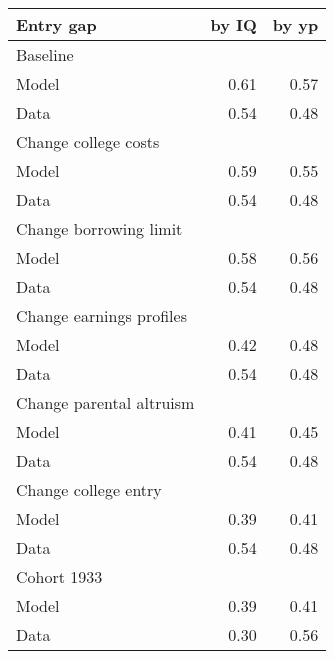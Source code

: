 \begin{tabular}{lrr}
\hline
Entry gap & by IQ  & by yp  \\ 
\hline
Baseline &   &   \\ 
Model & 0.61  & 0.57  \\ 
Data & 0.54  & 0.48  \\ 
Change college costs &   &   \\ 
Model & 0.59  & 0.55  \\ 
Data & 0.54  & 0.48  \\ 
Change borrowing limit &   &   \\ 
Model & 0.58  & 0.56  \\ 
Data & 0.54  & 0.48  \\ 
Change earnings profiles &   &   \\ 
Model & 0.42  & 0.48  \\ 
Data & 0.54  & 0.48  \\ 
Change parental altruism &   &   \\ 
Model & 0.41  & 0.45  \\ 
Data & 0.54  & 0.48  \\ 
Change college entry &   &   \\ 
Model & 0.39  & 0.41  \\ 
Data & 0.54  & 0.48  \\ 
Cohort 1933 &   &   \\ 
Model & 0.39  & 0.41  \\ 
Data & 0.30  & 0.56  \\ 
\hline
\end{tabular}%
